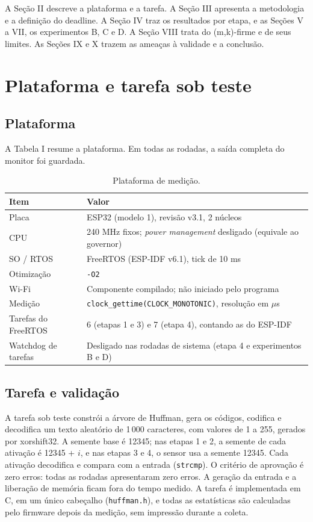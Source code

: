 \documentclass[conference,a4paper]{IEEEtran}
\begin{document}
A Seção II descreve a plataforma e a tarefa. A Seção III apresenta a metodologia e a definição do deadline. A Seção IV traz os resultados por etapa, e as Seções V a VII, os experimentos B, C e D. A Seção VIII trata do (m,k)-firme e de seus limites. As Seções IX e X trazem as ameaças à validade e a conclusão.

\section{Plataforma e tarefa sob teste}
\subsection{Plataforma}
A Tabela I resume a plataforma. Em todas as rodadas, a saída completa do monitor foi guardada.

\begin{table}[!t]
\centering
\caption{Plataforma de medição.}
\small
\setlength{\tabcolsep}{3pt}
\begin{tabular}{p{2.4cm}p{5.6cm}}
\toprule
Item & Valor \\
\midrule
Placa & ESP32 (modelo 1), revisão v3.1, 2 núcleos \\
CPU & 240 MHz fixos; \emph{power management} desligado (equivale ao governor) \\
SO / RTOS & FreeRTOS (ESP-IDF v6.1), tick de 10 ms \\
Otimização & \texttt{-O2} \\
Wi-Fi & Componente compilado; não iniciado pelo programa \\
Medição & \texttt{clock\_gettime(CLOCK\_MONOTONIC)}, resolução em $\mu$s \\
Tarefas do FreeRTOS & 6 (etapas 1 e 3) e 7 (etapa 4), contando as do ESP-IDF \\
Watchdog de tarefas & Desligado nas rodadas de sistema (etapa 4 e experimentos B e D) \\
\bottomrule
\end{tabular}
\end{table}

\subsection{Tarefa e validação}
A tarefa sob teste constrói a árvore de Huffman, gera os códigos, codifica e decodifica um texto aleatório de 1\,000 caracteres, com valores de 1 a 255, gerados por xorshift32. A semente base é 12345; nas etapas 1 e 2, a semente de cada ativação é 12345 + $i$, e nas etapas 3 e 4, o sensor usa a semente 12345. Cada ativação decodifica e compara com a entrada (\texttt{strcmp}). O critério de aprovação é zero erros: todas as rodadas apresentaram zero erros. A geração da entrada e a liberação de memória ficam fora do tempo medido. A tarefa é implementada em C, em um único cabeçalho (\texttt{huffman.h}), e todas as estatísticas são calculadas pelo firmware depois da medição, sem impressão durante a coleta.
\end{document}
